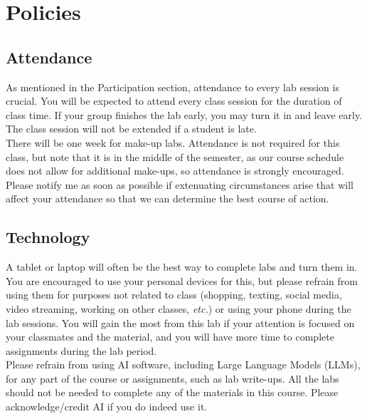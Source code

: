 \documentclass[11pt]{article}
\begin{document}
\section*{Policies}
 
\subsection*{Attendance}
 

As mentioned in the Participation section, attendance to every lab session is crucial. You will be expected to attend every class session for the duration of class time. If your group finishes the lab early, you may turn it in and leave early. The class session will not be extended if a student is late. \\

There will be one week for make-up labs. Attendance is not required for this class, but note that it is in the middle of the semester, as our course schedule does not allow for additional make-ups, so attendance is strongly encouraged. Please notify me as soon as possible if extenuating circumstances arise that will affect your attendance so that we can determine the best course of action. \\

\subsection*{Technology}

\noindent A tablet or laptop will often be the best way to complete labs and turn them in. You are encouraged to use your personal devices for this, but please refrain from using them for purposes not related to class (shopping, texting, social media, video streaming, working on other classes, \textit{etc.}) or using your phone during the lab sessions. You will gain the most from this lab if your attention is focused on your classmates and the material, and you will have more time to complete assignments during the lab period.  \\

Please refrain from using AI software, including Large Language Models (LLMs), for any part of the course or assignments, such as lab write-ups. All the labs should not be needed to complete any of the materials in this course. Please acknowledge/credit AI if you do indeed use it.\\
 
\end{document}
